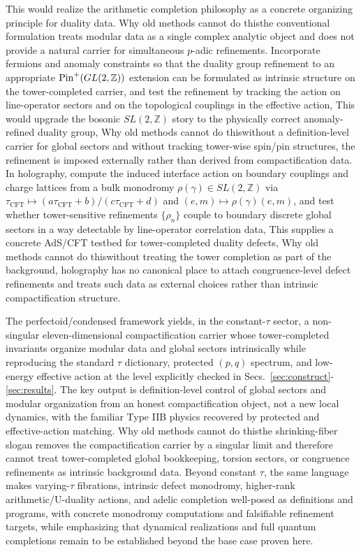 \documentclass[11pt]{article}
\theoremstyle{remark}
\newcommand{\Z}{\mathbb{Z}}
\begin{document}
This would realize the arithmetic completion philosophy as a concrete organizing principle for duality data. Why old methods cannot do this\:the conventional formulation treats modular data as a single complex analytic object and does not provide a natural carrier for simultaneous \(p\)-adic refinements. Incorporate fermions and anomaly constraints so that the duality group refinement to an appropriate \({\rm Pin}^{+}(GL(2,\Z))\) extension can be formulated as intrinsic structure on the tower-completed carrier, and test the refinement by tracking the action on line-operator sectors and on the topological couplings in the effective action, This would upgrade the bosonic \(SL(2,\Z)\) story to the physically correct anomaly-refined duality group, Why old methods cannot do this\:without a definition-level carrier for global sectors and without tracking tower-wise spin/pin structures, the refinement is imposed externally rather than derived from compactification data. In holography, compute the induced interface action on boundary couplings and charge lattices from a bulk monodromy \(\rho(\gamma)\in SL(2,\Z)\) via \(\tau_{\mathrm{CFT}}\mapsto (a\tau_{\mathrm{CFT}}+b)/(c\tau_{\mathrm{CFT}}+d)\) and \((e,m)\mapsto \rho(\gamma)(e,m)\), and test whether tower-sensitive refinements \(\{\rho_n\}\) couple to boundary discrete global sectors in a way detectable by line-operator correlation data, This supplies a concrete AdS/CFT testbed for tower-completed duality defects, Why old methods cannot do this\:without treating the tower completion as part of the background, holography has no canonical place to attach congruence-level defect refinements and treats such data as external choices rather than intrinsic compactification structure.

The perfectoid/condensed framework yields, in the constant-\(\tau\) sector, a non-singular eleven-dimensional compactification carrier whose tower-completed invariants organize modular data and global sectors intrinsically while reproducing the standard \(\tau\) dictionary, protected \((p,q)\) spectrum, and low-energy effective action at the level explicitly checked in Secs.~\ref{sec:construct}-\ref{sec:results}. The key output is definition-level control of global sectors and modular organization from an honest compactification object, not a new local dynamics, with the familiar Type IIB physics recovered by protected and effective-action matching. Why old methods cannot do this\:the shrinking-fiber slogan removes the compactification carrier by a singular limit and therefore cannot treat tower-completed global bookkeeping, torsion sectors, or congruence refinements as intrinsic background data. Beyond constant \(\tau\), the same language makes varying-\(\tau\) fibrations, intrinsic defect monodromy, higher-rank arithmetic/U-duality actions, and adelic completion well-posed as definitions and programs, with concrete monodromy computations and falsifiable refinement targets, while emphasizing that dynamical realizations and full quantum completions remain to be established beyond the base case proven here.
\end{document}

